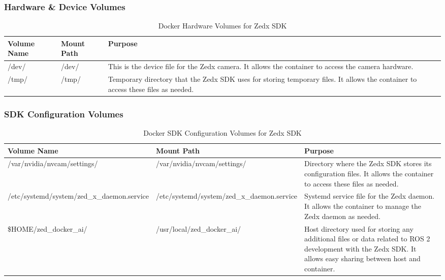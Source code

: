 \begin{landscape}

\subsubsection{Hardware \& Device Volumes}

\begin{table}[H]
    \centering
    \begin{tabular}{|l|l|p{9cm}|}
        \hline
        \textbf{Volume Name} & \textbf{Mount Path} & \textbf{Purpose} \\
        \hline
        /dev/ & /dev/ & This is the device file for the Zedx camera. It allows the container to access the camera hardware. \\
        \hline
        /tmp/ & /tmp/ & Temporary directory that the Zedx SDK uses for storing temporary files. It allows the container to access these files as needed. \\
        \hline
    \end{tabular}
    \caption{Docker Hardware Volumes for Zedx SDK}
    \label{tab:docker-volumes-hardware}
\end{table}

\subsubsection{SDK Configuration Volumes}

\begin{table}[H]
    \centering
    \begin{tabular}{|l|l|p{9cm}|}
        \hline
        \textbf{Volume Name} & \textbf{Mount Path} & \textbf{Purpose} \\
        \hline
        /var/nvidia/nvcam/settings/ & /var/nvidia/nvcam/settings/ & Directory where the Zedx SDK stores its configuration files. It allows the container to access these files as needed. \\
        \hline
        /etc/systemd/system/zed\_x\_daemon.service & /etc/systemd/system/zed\_x\_daemon.service & Systemd service file for the Zedx daemon. It allows the container to manage the Zedx daemon as needed. \\
        \hline
        \${HOME}/zed\_docker\_ai/ & /usr/local/zed\_docker\_ai/ & Host directory used for storing any additional files or data related to ROS 2 development with the Zedx SDK. It allows easy sharing between host and container. \\
        \hline
    \end{tabular}
    \caption{Docker SDK Configuration Volumes for Zedx SDK}
    \label{tab:docker-volumes-config}
\end{table}


\end{landscape}
